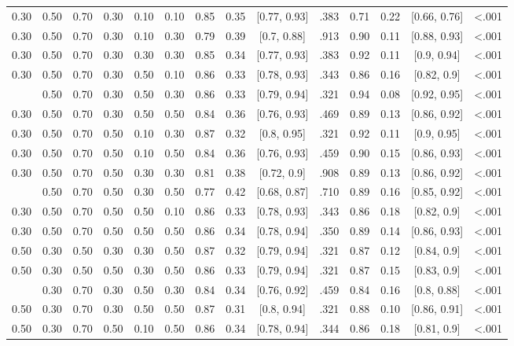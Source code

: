 \documentclass[
  11pt,
]{article}
\begin{document}
\begin{landscape}
\begin{ThreePartTable}
\begin{longtable}[t]{cccccccccccccc}
0.30 & 0.50 & 0.70 & 0.30 & 0.10 & 0.10 & 0.85 & 0.35 & {}[0.77, 0.93] & .383 & 0.71 & 0.22 & {}[0.66, 0.76] & <.001\\
0.30 & 0.50 & 0.70 & 0.30 & 0.10 & 0.30 & 0.79 & 0.39 & {}[0.7, 0.88] & .913 & 0.90 & 0.11 & {}[0.88, 0.93] & <.001\\
0.30 & 0.50 & 0.70 & 0.30 & 0.30 & 0.30 & 0.85 & 0.34 & {}[0.77, 0.93] & .383 & 0.92 & 0.11 & {}[0.9, 0.94] & <.001\\
0.30 & 0.50 & 0.70 & 0.30 & 0.50 & 0.10 & 0.86 & 0.33 & {}[0.78, 0.93] & .343 & 0.86 & 0.16 & {}[0.82, 0.9] & <.001\\
\addlinespace
0.30 & 0.50 & 0.70 & 0.30 & 0.50 & 0.30 & 0.86 & 0.33 & {}[0.79, 0.94] & .321 & 0.94 & 0.08 & {}[0.92, 0.95] & <.001\\
0.30 & 0.50 & 0.70 & 0.30 & 0.50 & 0.50 & 0.84 & 0.36 & {}[0.76, 0.93] & .469 & 0.89 & 0.13 & {}[0.86, 0.92] & <.001\\
0.30 & 0.50 & 0.70 & 0.50 & 0.10 & 0.30 & 0.87 & 0.32 & {}[0.8, 0.95] & .321 & 0.92 & 0.11 & {}[0.9, 0.95] & <.001\\
0.30 & 0.50 & 0.70 & 0.50 & 0.10 & 0.50 & 0.84 & 0.36 & {}[0.76, 0.93] & .459 & 0.90 & 0.15 & {}[0.86, 0.93] & <.001\\
0.30 & 0.50 & 0.70 & 0.50 & 0.30 & 0.30 & 0.81 & 0.38 & {}[0.72, 0.9] & .908 & 0.89 & 0.13 & {}[0.86, 0.92] & <.001\\
\addlinespace
0.30 & 0.50 & 0.70 & 0.50 & 0.30 & 0.50 & 0.77 & 0.42 & {}[0.68, 0.87] & .710 & 0.89 & 0.16 & {}[0.85, 0.92] & <.001\\
0.30 & 0.50 & 0.70 & 0.50 & 0.50 & 0.10 & 0.86 & 0.33 & {}[0.78, 0.93] & .343 & 0.86 & 0.18 & {}[0.82, 0.9] & <.001\\
0.30 & 0.50 & 0.70 & 0.50 & 0.50 & 0.50 & 0.86 & 0.34 & {}[0.78, 0.94] & .350 & 0.89 & 0.14 & {}[0.86, 0.93] & <.001\\
0.50 & 0.30 & 0.50 & 0.30 & 0.30 & 0.50 & 0.87 & 0.32 & {}[0.79, 0.94] & .321 & 0.87 & 0.12 & {}[0.84, 0.9] & <.001\\
0.50 & 0.30 & 0.50 & 0.50 & 0.30 & 0.50 & 0.86 & 0.33 & {}[0.79, 0.94] & .321 & 0.87 & 0.15 & {}[0.83, 0.9] & <.001\\
\addlinespace
0.50 & 0.30 & 0.70 & 0.30 & 0.50 & 0.30 & 0.84 & 0.34 & {}[0.76, 0.92] & .459 & 0.84 & 0.16 & {}[0.8, 0.88] & <.001\\
0.50 & 0.30 & 0.70 & 0.30 & 0.50 & 0.50 & 0.87 & 0.31 & {}[0.8, 0.94] & .321 & 0.88 & 0.10 & {}[0.86, 0.91] & <.001\\
0.50 & 0.30 & 0.70 & 0.50 & 0.10 & 0.50 & 0.86 & 0.34 & {}[0.78, 0.94] & .344 & 0.86 & 0.18 & {}[0.81, 0.9] & <.001\\

\end{longtable}
\end{ThreePartTable}
\end{landscape}
\end{document}
